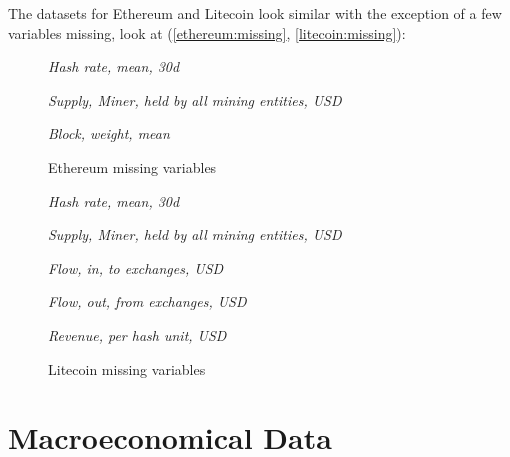 The datasets for Ethereum and Litecoin look similar with the exception of a few variables missing,
look at (\autoref{ethereum:missing}, \autoref{litecoin:missing}):

\begin{figure}[!htbp]
    \begin{center}
    \caption{Ethereum missing variables}\label{ethereum:missing}
    \begin{boxeditemize}
        \item \textit{Hash rate, mean, 30d}
        \item \textit{Supply, Miner, held by all mining entities, USD}
        \item \textit{Block, weight, mean}
    \end{boxeditemize}
    \end{center}
    \end{figure}

    \begin{figure}[!htbp]
        \begin{center}
        \caption{Litecoin missing variables}\label{litecoin:missing}
        \begin{boxeditemize}
            \item \textit{Hash rate, mean, 30d}
            \item \textit{Supply, Miner, held by all mining entities, USD}
            \item \textit{Flow, in, to exchanges, USD}
            \item \textit{Flow, out, from exchanges, USD}
            \item \textit{Revenue, per hash unit, USD}
        \end{boxeditemize}
        \end{center}
        \end{figure}


\section{Macroeconomical Data}

